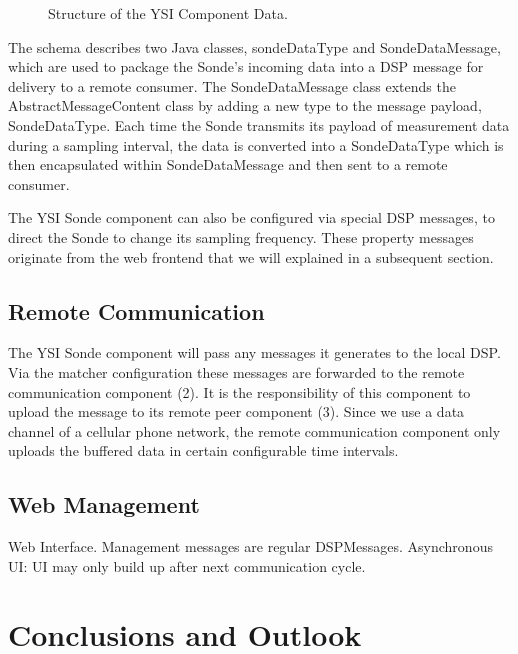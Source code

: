 \documentclass[conference]{IEEEtran}
\begin{document}
\begin{figure}[!htb]
\centering
{}
\caption{\label{FIG_DSP_YSI_DATA} Structure of the YSI Component Data.}
\end{figure}

The schema describes two Java classes, sondeDataType and SondeDataMessage, 
which are used to package the Sonde's incoming data into a DSP message for delivery 
to a remote consumer.  The SondeDataMessage class extends the AbstractMessageContent 
class by adding a new type to the message payload, SondeDataType.  Each time the Sonde
transmits its payload of measurement data during a sampling interval, the data is converted 
into a SondeDataType which is then encapsulated within SondeDataMessage and then sent 
to a remote consumer.

The YSI Sonde component can also be configured via special DSP messages, to direct the 
Sonde to change its sampling frequency.  These property messages originate from the web 
frontend that we will explained in a subsequent section.

\subsection{Remote Communication}

The YSI Sonde component will pass any messages it generates to the
local DSP. Via the matcher configuration these messages are forwarded
to the remote communication component (2). It is the responsibility of
this component to upload the message to its remote peer component
(3). Since we use a data channel of a cellular phone network, the
remote communication component only uploads the buffered data in
certain configurable time intervals. 

\subsection{Web Management}

Web Interface. Management messages are regular
DSPMessages. Asynchronous UI: UI may only build up after next
communication cycle.

\section{Conclusions and Outlook}
\end{document}
